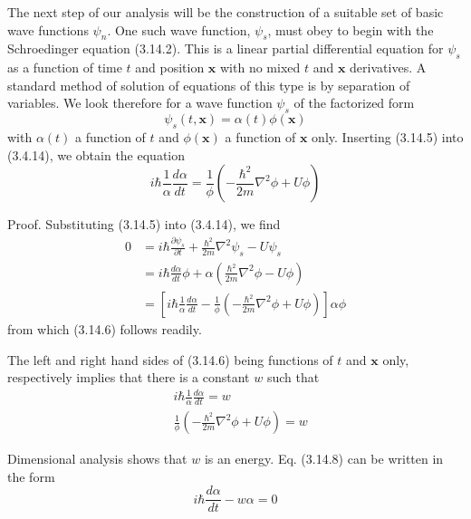 \documentclass{article}
\begin{document}
The next step of our analysis will be the construction of a suitable set of basic wave functions $\psi_{n}$. One such wave function, $\psi_{s}$, must obey to begin with the Schroedinger equation (3.14.2). This is a linear partial differential equation for $\psi_{s}$ as a function of time $t$ and position $\boldsymbol{x}$ with no mixed $t$ and $\boldsymbol{x}$ derivatives. A standard method of solution of equations of this type is by separation of variables. We look therefore for a wave function $\psi_{s}$ of the factorized form
$$
\begin{equation*}
\psi_{s}(t, \boldsymbol{x})=\alpha(t) \phi(\boldsymbol{x}) \tag{3.14.5}
\end{equation*}
$$
with $\alpha(t)$ a function of $t$ and $\phi(\boldsymbol{x})$ a function of $\boldsymbol{x}$ only. Inserting (3.14.5) into
(3.4.14), we obtain the equation
$$
\begin{equation*}
i \hbar \frac{1}{\alpha} \frac{d \alpha}{d t}=\frac{1}{\phi}\left(-\frac{\hbar^{2}}{2 m} \nabla^{2} \phi+U \phi\right) \tag{3.14.6}
\end{equation*}
$$

Proof. Substituting (3.14.5) into (3.4.14), we find
$$
\begin{align*}
0 & =i \hbar \frac{\partial \psi_{s}}{\partial t}+\frac{\hbar^{2}}{2 m} \nabla^{2} \psi_{s}-U \psi_{s}  \tag{3.14.7}\\
& =i \hbar \frac{d \alpha}{d t} \phi+\alpha\left(\frac{\hbar^{2}}{2 m} \nabla^{2} \phi-U \phi\right) \\
& =\left[i \hbar \frac{1}{\alpha} \frac{d \alpha}{d t}-\frac{1}{\phi}\left(-\frac{\hbar^{2}}{2 m} \nabla^{2} \phi+U \phi\right)\right] \alpha \phi
\end{align*}
$$
from which (3.14.6) follows readily.

The left and right hand sides of (3.14.6) being functions of $t$ and $\boldsymbol{x}$ only, respectively implies that there is a constant $w$ such that
$$
\begin{align*}
& i \hbar \frac{1}{\alpha} \frac{d \alpha}{d t}=w  \tag{3.14.8}\\
& \frac{1}{\phi}\left(-\frac{\hbar^{2}}{2 m} \nabla^{2} \phi+U \phi\right)=w \tag{3.14.9}
\end{align*}
$$

Dimensional analysis shows that $w$ is an energy.
Eq. (3.14.8) can be written in the form
$$
\begin{equation*}
i \hbar \frac{d \alpha}{d t}-w \alpha=0 \tag{3.14.10}
\end{equation*}
$$
\end{document}
